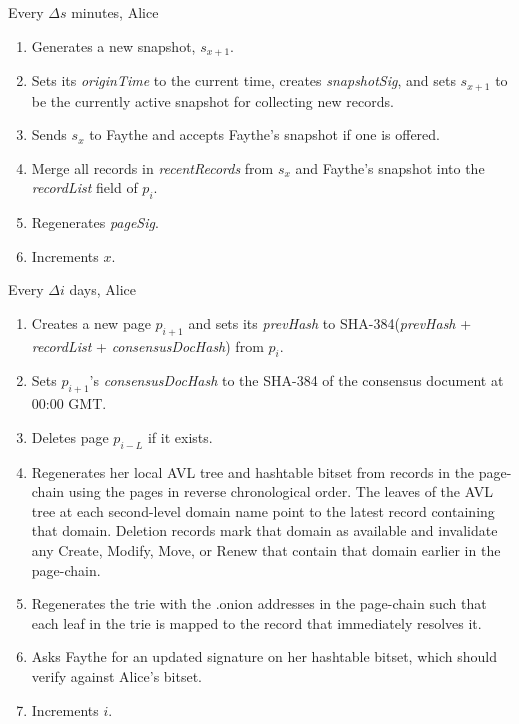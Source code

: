 Every $ \Delta s $ minutes, Alice

\begin{enumerate}
	\item Generates a new snapshot, $ s_{x+1} $.
	\item Sets its \emph{originTime} to the current time, creates \emph{snapshotSig}, and sets $ s_{x+1} $ to be the currently active snapshot for collecting new records.
	\item Sends $ s_{x} $ to Faythe and accepts Faythe's snapshot if one is offered.
	\item Merge all records in \emph{recentRecords} from $ s_{x} $ and Faythe's snapshot into the \emph{recordList} field of $ p_{i} $.
	\item Regenerates \emph{pageSig}.
	\item Increments $ x $.
\end{enumerate}

Every $ \Delta i $ days, Alice

\begin{enumerate}
	\item Creates a new page $ p_{i + 1} $ and sets its \emph{prevHash} to SHA-384(\emph{prevHash} + \emph{recordList} + \emph{consensusDocHash}) from $ p_{i} $.
	\item Sets $ p_{i + 1} $'s \emph{consensusDocHash} to the SHA-384 of the consensus document at 00:00 GMT.
	\item Deletes page $ p_{i - L} $ if it exists.
	\item Regenerates her local AVL tree and hashtable bitset from records in the page-chain using the pages in reverse chronological order. The leaves of the AVL tree at each second-level domain name point to the latest record containing that domain. Deletion records mark that domain as available and invalidate any Create, Modify, Move, or Renew that contain that domain earlier in the page-chain.
	\item Regenerates the trie with the .onion addresses in the page-chain such that each leaf in the trie is mapped to the record that immediately resolves it.
	\item Asks Faythe for an updated signature on her hashtable bitset, which should verify against Alice's bitset.
	\item Increments $ i $.
\end{enumerate}

